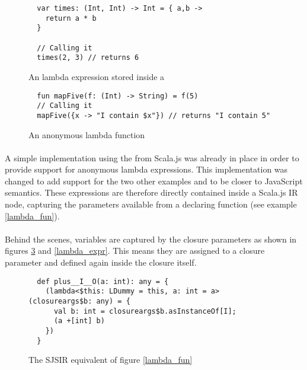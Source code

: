 \begin{figure}[h]
  \begin{verbatim}
  var times: (Int, Int) -> Int = { a,b ->
    return a * b
  }
  
  // Calling it
  times(2, 3) // returns 6
  \end{verbatim}
  \caption{An  lambda expression stored inside a }
  \label{lambda_var}
\end{figure}


\begin{figure}[h!]
  \begin{verbatim}
  fun mapFive(f: (Int) -> String) = f(5)
  // Calling it
  mapFive({x -> "I contain $x"}) // returns "I contain 5"
  \end{verbatim}
  \caption{An anonymous lambda function}
  \label{lambda_anon}
\end{figure}

\paragraph{} A simple implementation using the  from Scala.js was 
already in place in order to provide support for anonymous lambda expressions. This 
implementation was changed to add support for the two other examples and to be closer to JavaScript 
semantics. These expressions are therefore directly contained inside a Scala.js 
 IR node, capturing the parameters available from a declaring function (see 
example \ref{lambda_fun}).

\paragraph{} Behind the scenes, variables are captured by the closure parameters as shown in 
figures \ref{lambda_fun_ir} and \ref{lambda_expr}. This means they are assigned to a closure 
parameter and defined again inside the closure itself.

\begin{figure}[h]
  \begin{verbatim}
  def plus__I__O(a: int): any = {
    (lambda<$this: LDummy = this, a: int = a>(closureargs$b: any) = {
      val b: int = closureargs$b.asInstanceOf[I];
      (a +[int] b)
    })
  }
  \end{verbatim}
  \caption{The SJSIR equivalent of figure \ref{lambda_fun}}
  \label{lambda_fun_ir}
\end{figure}


